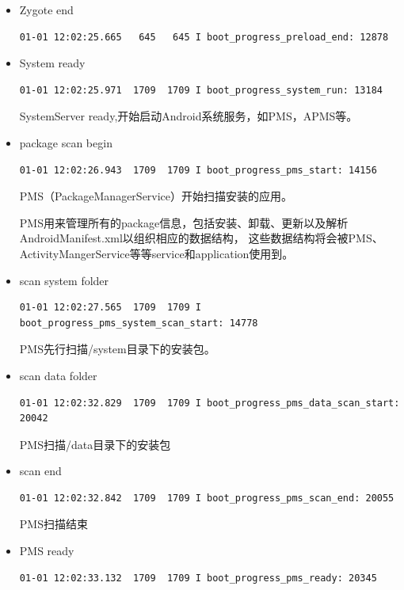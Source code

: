 \begin{itemize}
\item Zygote end

\begin{lstlisting}
01-01 12:02:25.665   645   645 I boot_progress_preload_end: 12878
\end{lstlisting}


\item System ready
\begin{lstlisting}
01-01 12:02:25.971  1709  1709 I boot_progress_system_run: 13184
\end{lstlisting}
SystemServer ready,开始启动Android系统服务，如PMS，APMS等。






\item  package scan begin
\begin{lstlisting}
01-01 12:02:26.943  1709  1709 I boot_progress_pms_start: 14156
\end{lstlisting}
PMS（PackageManagerService）开始扫描安装的应用。

PMS用来管理所有的package信息，包括安装、卸载、更新以及解析AndroidManifest.xml以组织相应的数据结构，
这些数据结构将会被PMS、ActivityMangerService等等service和application使用到。



\item  scan system folder
\begin{lstlisting}
01-01 12:02:27.565  1709  1709 I boot_progress_pms_system_scan_start: 14778
\end{lstlisting}

PMS先行扫描/system目录下的安装包。


\item  scan data folder
\begin{lstlisting}
01-01 12:02:32.829  1709  1709 I boot_progress_pms_data_scan_start: 20042
\end{lstlisting}

PMS扫描/data目录下的安装包


\item scan end

\begin{lstlisting}
01-01 12:02:32.842  1709  1709 I boot_progress_pms_scan_end: 20055
\end{lstlisting}

PMS扫描结束


\item PMS ready

\begin{lstlisting}
01-01 12:02:33.132  1709  1709 I boot_progress_pms_ready: 20345
\end{lstlisting}


\end{itemize}
